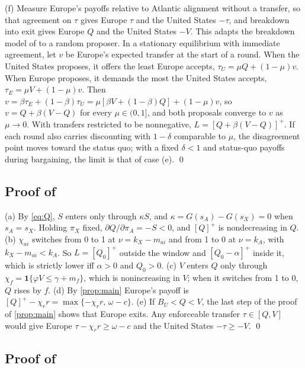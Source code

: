 (f) Measure Europe's payoffs relative to Atlantic alignment without a transfer, so that agreement on $\tau$ gives Europe $\tau$ and the United States $-\tau$, and breakdown into exit gives Europe $Q$ and the United States $-V$. This adapts the breakdown model of \citet{binmore1986nash} to a random proposer. In a stationary equilibrium with immediate agreement, let $v$ be Europe's expected transfer at the start of a round. When the United States proposes, it offers the least Europe accepts, $\tau_U = \mu Q + (1-\mu)v$. When Europe proposes, it demands the most the United States accepts, $\tau_E = \mu V + (1-\mu)v$. Then $v = \beta\tau_E + (1-\beta)\tau_U = \mu[\beta V + (1-\beta)Q] + (1-\mu)v$, so $v = Q + \beta(V-Q)$ for every $\mu\in(0,1]$, and both proposals converge to $v$ as $\mu \to 0$. With transfers restricted to be nonnegative, $L = [Q + \beta(V-Q)]^+$. If each round also carries discounting with $1-\delta$ comparable to $\mu$, the disagreement point moves toward the status quo; with a fixed $\delta<1$ and status-quo payoffs during bargaining, the limit is that of case (e). \qed

\subsection*{Proof of }

(a) By \cref{eq:Q}, $S$ enters only through $\kappa S$, and $\kappa = G(s_A) - G(s_X) = 0$ when $s_A = s_X$. Holding $\pi_X$ fixed, $\partial Q/\partial \pi_A = -S< 0$, and $[Q]^+$ is nondecreasing in $Q$.
(b) $\chi_{ai}$ switches from 0 to 1 at $\nu = k_X - m_{ai}$ and from 1 to 0 at $\nu = k_A$, with $k_X - m_{ai} < k_A$. So $L=[Q_0]^+$ outside the window and $[Q_0-\alpha]^+$ inside it, which is strictly lower iff $\alpha>0$ and $Q_0>0$.
(c) $V$ enters $Q$ only through $\chi_f = \mathbf{1}\{\varphi V \leq \gamma + m_f\}$, which is nonincreasing in $V$; when it switches from 1 to 0, $Q$ rises by $f$.
(d) By \cref{prop:main} Europe's payoff is $[Q]^+ - \chi_r r = \max\{-\chi_r r,\, \omega - c\}$.
(e) If $B_U < Q < V$, the last step of the proof of \cref{prop:main} shows that Europe exits. Any enforceable transfer $\tau\in[Q,V]$ would give Europe $\tau - \chi_r r \geq \omega - c$ and the United States $-\tau \geq -V$. \qed

\subsection*{Proof of }

